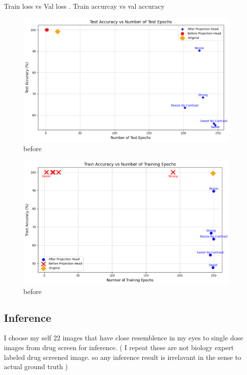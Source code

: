 Train loss vs Val loss . Train accurcay  vs val accuracy 
          \begin{figure}[H]
            \centering
            \includegraphics[scale=0.5]{figures/test_class.png} 
            \caption{before}
            \label{fig:before}
          \end{figure}

          \begin{figure}[H]
            \centering
            \includegraphics[scale=0.5]{figures/train_class.png} 
            \caption{before}
            \label{fig:before}
          \end{figure}
\subsection{Inference}

I choose my self 22 images that have close resemblence in my eyes to single dose images from drug screen for inference. ( I repeat these are not biology expert labeled drug 
screened image. so any inference result is irrelavant in the sense to actual ground truth )

